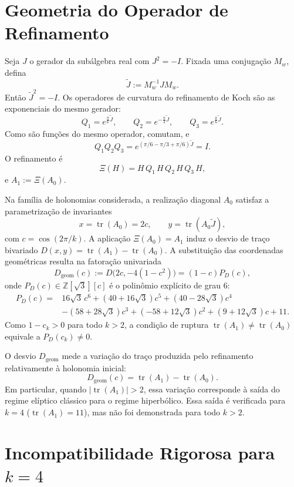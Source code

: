 \documentclass[11pt,a4paper]{article}
\begin{document}
\section{Geometria do Operador de Refinamento}

Seja \(J\) o gerador da subálgebra real com \(J^2=-I\). Fixada uma conjugação \(M_w\), defina
\[
\widetilde{J}:=M_w^{-1}JM_w.
\]
Então \(\widetilde{J}^2=-I\). Os operadores de curvatura do refinamento de Koch são as exponenciais do mesmo gerador:
\[
Q_1=e^{\frac{\pi}{6}\widetilde{J}},\qquad
Q_2=e^{-\frac{\pi}{3}\widetilde{J}},\qquad
Q_3=e^{\frac{\pi}{6}\widetilde{J}}.
\]
Como são funções do mesmo operador, comutam, e
\[
Q_1Q_2Q_3=e^{(\pi/6-\pi/3+\pi/6)\widetilde{J}}=I.
\]
O refinamento é
\[
\Xi(H)=H\,Q_1\,H\,Q_2\,H\,Q_3\,H,
\]
e \(A_1:=\Xi(A_0)\).

Na família de holonomias considerada, a realização diagonal \(A_0\) satisfaz a parametrização de invariantes
\[
x=\operatorname{tr}(A_0)=2c,\qquad y=\operatorname{tr}(A_0\widetilde{J}),
\]
com \(c=\cos(2\pi/k)\). A aplicação \(\Xi(A_0)=A_1\) induz o desvio de traço bivariado \(D(x,y)=\operatorname{tr}(A_1)-\operatorname{tr}(A_0)\). A substituição das coordenadas geométricas resulta na fatoração univariada
\[
D_{\mathrm{geom}}(c):=D\bigl(2c,-4(1-c^2)\bigr)=(1-c)P_D(c),
\]
onde \(P_D(c)\in\mathbb{Z}[\sqrt{3}][c]\) é o polinômio explícito de grau 6:
\[
\begin{aligned}
P_D(c)={}&16\sqrt{3}\,c^6+(40+16\sqrt{3})c^5+(40-28\sqrt{3})c^4\\
&-(58+28\sqrt{3})c^3+(-58+12\sqrt{3})c^2+(9+12\sqrt{3})c+11.
\end{aligned}
\]
Como \(1-c_k>0\) para todo \(k>2\), a condição de ruptura \(\operatorname{tr}(A_1)\neq\operatorname{tr}(A_0)\) equivale a \(P_D(c_k)\neq0\).

O desvio \(D_{\mathrm{geom}}\) mede a variação do traço produzida pelo refinamento relativamente à holonomia inicial:
\[
D_{\mathrm{geom}}(c)=\operatorname{tr}(A_1)-\operatorname{tr}(A_0).
\]
Em particular, quando \(\lvert\operatorname{tr}(A_1)\rvert>2\), essa variação corresponde à saída do regime elíptico clássico para o regime hiperbólico. Essa saída é verificada para \(k=4\) (\(\operatorname{tr}(A_1)=11\)), mas não foi demonstrada para todo \(k>2\).

\section{Incompatibilidade Rigorosa para \texorpdfstring{$k=4$}{k=4}}
\end{document}
